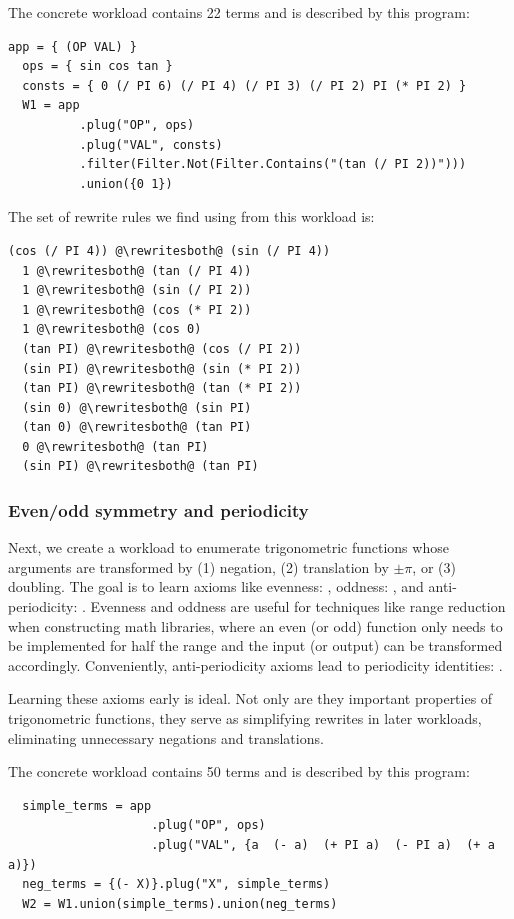 The concrete workload contains 22 terms and is described by this \enumo program:
\begin{lstlisting}[name=trig]
  app = { (OP VAL) }
  ops = { sin cos tan }
  consts = { 0 (/ PI 6) (/ PI 4) (/ PI 3) (/ PI 2) PI (* PI 2) }
  W1 = app
          .plug("OP", ops)
          .plug("VAL", consts)
          .filter(Filter.Not(Filter.Contains("(tan (/ PI 2))")))
          .union({0 1})
\end{lstlisting}

The set of rewrite rules we find using \ff from this workload is:
\begin{lstlisting}[escapechar=@]
  (cos (/ PI 4)) @\rewritesboth@ (sin (/ PI 4))
  1 @\rewritesboth@ (tan (/ PI 4))
  1 @\rewritesboth@ (sin (/ PI 2))
  1 @\rewritesboth@ (cos (* PI 2))
  1 @\rewritesboth@ (cos 0)
  (tan PI) @\rewritesboth@ (cos (/ PI 2))
  (sin PI) @\rewritesboth@ (sin (* PI 2))
  (tan PI) @\rewritesboth@ (tan (* PI 2))
  (sin 0) @\rewritesboth@ (sin PI)
  (tan 0) @\rewritesboth@ (tan PI)
  0 @\rewritesboth@ (tan PI)
  (sin PI) @\rewritesboth@ (tan PI)
\end{lstlisting}

\subsubsection{Even/odd symmetry and periodicity}
Next, we create a workload to
  enumerate trigonometric functions whose arguments are transformed by (1) negation,
  (2) translation by $\pm \pi$, or (3) doubling.
The goal is to learn axioms like
  evenness: ,
  oddness: ,
  and anti-periodicity: .
Evenness and oddness are useful for techniques like range reduction
  when constructing math libraries,
  where an even (or odd) function only needs
  to be implemented for half the range and
  the input (or output) can be transformed accordingly.
Conveniently, anti-periodicity axioms lead to periodicity identities:
  .

Learning these axioms early is ideal.
Not only are they important properties of trigonometric functions,
  they serve as simplifying rewrites in later workloads,
  eliminating unnecessary negations and translations.

The concrete workload contains 50 terms and is described by this \enumo program:
\begin{lstlisting}
  simple_terms = app
                    .plug("OP", ops)
                    .plug("VAL", {a  (- a)  (+ PI a)  (- PI a)  (+ a a)})
  neg_terms = {(- X)}.plug("X", simple_terms)
  W2 = W1.union(simple_terms).union(neg_terms)
\end{lstlisting}

